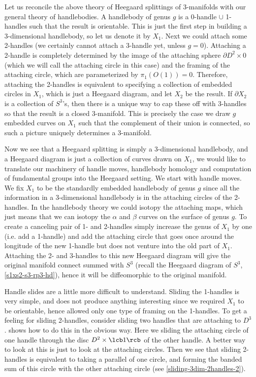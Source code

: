Let us reconcile the above theory of Heegaard splittings of 3-manifolds with our general theory of handlebodies. A handlebody of genus $g$ is a 0-handle $\cup$ 1-handles such that the result is orientable. This is just the first step in building a 3-dimensional handlebody, so let us denote it by $X_1$. Next we could attach some 2-handles (we certainly cannot attach a 3-handle yet, unless $g=0$). Attaching a 2-handle is completely determined by the image of the attaching sphere $\partial D^2 \times 0$ (which we will call the attaching circle in this case) and the framing of the attaching circle, which are parameterized by $\pi_1(O(1))=0$. Therefore, attaching the 2-handles is equivalent to specifying a collection of embedded circles in $X_1$, which is just a Heegaard diagram, and let $X_2$ be the result. If $\partial X_2$ is a collection of $S^3$'s, then there is a unique way to cap these off with 3-handles so that the result is a closed 3-manifold. This is precisely the case we draw $g$ embedded curves on $X_1$ such that the complement of their union is connected, so such a picture uniquely determines a 3-manifold.

Now we see that a Heegaard splitting is simply a 3-dimensional handlebody, and a Heegaard diagram is just a collection of curves drawn on $X_1$, we would like to translate our machinery of handle moves, handlebody homology and computation of fundamental groups into the Heegaard setting. We start with handle moves. We fix $X_1$ to be the standardly embedded handlebody of genus $g$ since all the information in a 3-dimensional handlebody is in the attaching circles of the 2-handles. In the handlebody theory we could isotopy the attaching maps, which just means that we can isotopy the $\alpha$ and $\beta$ curves on the surface of genus $g$. To create a canceling pair of 1- and 2-handles simply increase the genus of $X_1$ by one (i.e. add a 1-handle) and add the attaching circle that goes once around the longitude of the new 1-handle but does not venture into the old part of $X_1$. Attaching the 2- and 3-handles to this new Heegaard diagram will give the original manifold connect summed with $S^3$ (recall the Heegaard diagram of $S^3$, \cref{s1xs2-s3-rp3-hd}), hence it will be diffeomorphic to the original manifold.

Handle slides are a little more difficult to understand. Sliding the 1-handles is very simple, and does not produce anything interesting since we required $X_1$ to be orientable, hence allowed only one type of framing on the 1-handles. To get a feeling for sliding 2-handles, consider sliding two handles that are attaching to $D^3$.  shows how to do this in the obvious way. Here we sliding the attaching circle of one handle through the disc $D^2 \times \lcb 1 \rcb$ of the other handle. A better way to look at this is just to look at the attaching circles. Then we see that sliding 2-handles is equivalent to taking a parallel of one circle, and forming the banded sum of this circle with the other attaching circle (see \cref{sliding-3dim-2handles-2}). 

